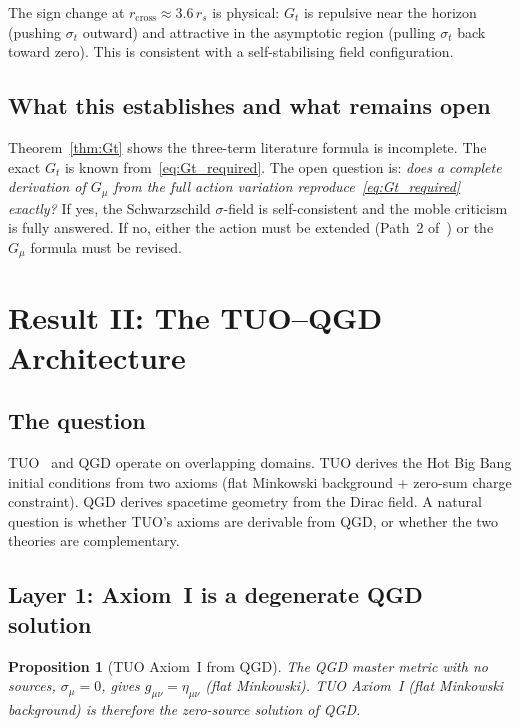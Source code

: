 \documentclass[11pt,a4paper]{article}
\theoremstyle{plain}
\newtheorem{proposition}[theorem]{Proposition}
\theoremstyle{definition}
\theoremstyle{remark}
\newcommand{\rs}{r_s}
\begin{document}
The sign change at $r_{\mathrm{cross}} \approx 3.6\,\rs$ is physical: $G_t$ is
repulsive near the horizon (pushing $\sigma_t$ outward) and attractive
in the asymptotic region (pulling $\sigma_t$ back toward zero).  This is
consistent with a self-stabilising field configuration.

\subsection{What this establishes and what remains open}

Theorem~\ref{thm:Gt} shows the three-term literature formula is incomplete.
The exact $G_t$ is known from~\eqref{eq:Gt_required}.  The open question is:
\emph{does a complete derivation of $G_\mu$ from the full action variation
reproduce~\eqref{eq:Gt_required} exactly?}  If yes, the Schwarzschild
$\sigma$-field is self-consistent and the moble criticism is fully answered.
If no, either the action must be extended (Path~2 of~\cite{matshaba2026:kin_var})
or the $G_\mu$ formula must be revised.

\section{Result II: The TUO--QGD Architecture}
\label{sec:architecture}

\subsection{The question}

TUO~\cite{matshaba2026:tuo} and QGD operate on overlapping domains.
TUO derives the Hot Big Bang initial conditions from two axioms (flat
Minkowski background + zero-sum charge constraint).  QGD derives spacetime
geometry from the Dirac field.  A natural question is whether TUO's axioms
are derivable from QGD, or whether the two theories are complementary.

\subsection{Layer 1: Axiom~I is a degenerate QGD solution}

\begin{proposition}[TUO Axiom~I from QGD]\label{prop:axiom1}
The QGD master metric with no sources, $\sigma_\mu = 0$, gives
$g_{\mu\nu} = \eta_{\mu\nu}$ (flat Minkowski).  TUO Axiom~I
(flat Minkowski background) is therefore the zero-source solution
of QGD.
\end{proposition}
\end{document}
